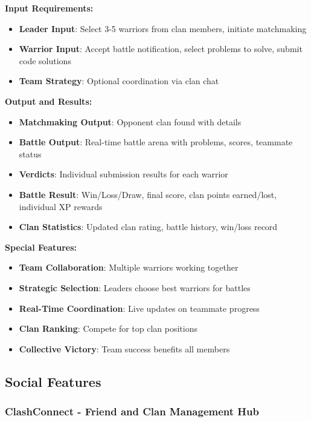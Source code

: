 \documentclass[12pt,a4paper]{article}
\begin{document}
\textbf{Input Requirements:}
\begin{itemize}[leftmargin=1.8em]
\item \textbf{Leader Input}: Select 3-5 warriors from clan members, initiate matchmaking
\item \textbf{Warrior Input}: Accept battle notification, select problems to solve, submit code solutions
\item \textbf{Team Strategy}: Optional coordination via clan chat
\end{itemize}

\textbf{Output and Results:}
\begin{itemize}[leftmargin=1.8em]
\item \textbf{Matchmaking Output}: Opponent clan found with details
\item \textbf{Battle Output}: Real-time battle arena with problems, scores, teammate status
\item \textbf{Verdicts}: Individual submission results for each warrior
\item \textbf{Battle Result}: Win/Loss/Draw, final score, clan points earned/lost, individual XP rewards
\item \textbf{Clan Statistics}: Updated clan rating, battle history, win/loss record
\end{itemize}

\textbf{Special Features:}
\begin{itemize}[leftmargin=1.8em]
\item \textbf{Team Collaboration}: Multiple warriors working together
\item \textbf{Strategic Selection}: Leaders choose best warriors for battles
\item \textbf{Real-Time Coordination}: Live updates on teammate progress
\item \textbf{Clan Ranking}: Compete for top clan positions
\item \textbf{Collective Victory}: Team success benefits all members
\end{itemize}

\FloatBarrier

\subsection{Social Features}

\subsubsection{ClashConnect - Friend and Clan Management Hub}
\end{document}
